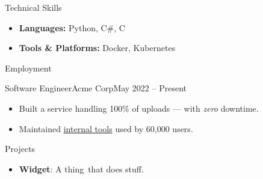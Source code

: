 \documentclass[]{mcdowellcv}
\begin{document}
	\makeheader

    \begin{cvsection}{Technical Skills}
        \begin{cvsubsection}{}{}{}
            \begin{itemize}
                \item \textbf{Languages:} Python, C\#, C
                \item \textbf{Tools \& Platforms:} Docker, Kubernetes %
            \end{itemize}
        \end{cvsubsection}
    \end{cvsection}

	\begin{cvsection}{Employment}
        \begin{cvsubsection}{Software Engineer}{Acme Corp}{May 2022 -- Present}
			\begin{itemize}
                \item Built a service handling 100\% of uploads --- with \textit{zero} downtime.
				\item Maintained \href{https://acme.example}{internal tools} used by 60,000 users.
			\end{itemize}
		\end{cvsubsection}
	\end{cvsection}

	\begin{cvsection}{Projects}
		\begin{cvsubsection}{}{}{}
			\begin{itemize}
                \item \textbf{Widget}: A thing~that does stuff.
			\end{itemize}
		\end{cvsubsection}
	\end{cvsection}
\end{document}

